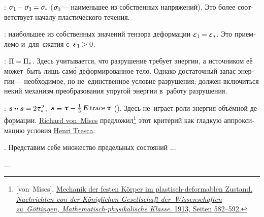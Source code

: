 \begin{otherlanguage}{russian}

:
${\mathsigma_1 \hspace{-0.2ex} - \mathsigma_3 \hspace{-0.1ex} = \tensilestrength}$ ($\mathsigma_3$\:--- наименьшее из собственных напряжений).
Это более соответствует началу пластического течения.

\::
наибольшее из собственных значений тензора деформации ${\infinitesimaldeformationeigenvalue{1} \hspace{-0.2ex} = \infinitesimaldeformationeigenvalue{*}}$.
Это приемлемо и~для~сжатия с~${\infinitesimaldeformationeigenvalue{1} \hspace{-0.12ex} > 0}$.

\::
${\Pi = \Pi_*}$.
Здесь учитывается, что разрушение требует энергии, а источником её может~быть лишь сам\'{о} деформированное тело.
Однако достаточный запас энергии\:--- необходимое, но не~единственное условие разрушения; должен включиться некий механизм преобразования упругой энергии в~работу разрушения.

\::
${\stressdeviator \dotdotp \stressdeviator = 2 \mathtau_{*}^{\hspace{.25ex}2}}$, ${\, \stressdeviator \equiv \cauchystress - \frac{1}{3} \hspace{.25ex} \UnitDyad \trace{\hspace{-0.1ex}\cauchystress}}$ ().
Здесь не~играет роли энергия объёмной деформации.
\href{https://en.wikipedia.org/wiki/Richard_von_Mises}{Richard von~Mises} предложил\footnote{[von~Mises]. \href{https://gdz.sub.uni-goettingen.de/id/PPN252457811_1913?tify=\%7B"pages":\%5B602\%5D,"view":"info"\%7D}{Mechanik der festen K\"{o}rper im plastisch-deformablen Zustand. \emph{Nachrichten von der K\"{o}niglichen Gesellschaft der~Wis\-sen\-schaf\-ten zu~Göttingen, Mathematisch-physikalische Klasse.} 1913, Seiten 582\hbox{--}592.}}\hspace{-0.25ex}
этот критерий как гладкую аппроксимацию условия \href{https://en.wikipedia.org/wiki/Henri_Tresca}{Henri Tresca}.

.
Представим себе множество предельных состояний ...

...



\end{otherlanguage}

